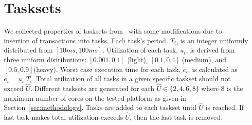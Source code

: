 \section{Tasksets}\label{sec:exp_tasksets_properties}
%
We collected properties of tasksets from~\cite{6001644,6064513,brandenburg2008comparison,key-4,bc+08,5161514,
springerlink:10.1007/s11241-010-9097-2,springerlink:10.1007/s10617-012-9090-1,
lakshmanan2009coordinated,4700432,Baker05acomparison,lindsay2012lwfg} with some modifications due to insertion of transactions into tasks. Each task's period, $T_i$, is an integer uniformly distributed from $[10ms,100ms]$. Utilization of each task, $u_i$, is derived from three uniform distributions: $[0.001,0.1]$ (light), $[0.1,0.4]$ (medium), and $[0.5,0.9]$(heavy). Worst case execution time for each task, $e_i$, is calculated as $e_i=u_i.T_i$. Total utilization of all tasks in a given specific taskset should not exceed $\hat{U}$. Different tasksets are generated for each $\hat{U} \in \{2,4,6,8\}$ where 8 is the maximum number of cores on the tested platform as given in Section~\ref{sec:methodology}. Tasks are added to each taskset until $\hat{U}$ is reached. If last task makes total utilization exceeds $\hat{U}$, then the last task is removed.

